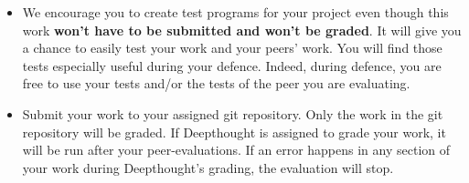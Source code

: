\begin{itemize}
  \item We encourage you to create test programs for your
  project even though this work \textbf{won't have to be
  submitted and won't be graded}. It will give you a chance
  to easily test your work and your peers’ work. You will find
  those tests especially useful during your defence. Indeed,
  during defence, you are free to use your tests and/or the
  tests of the peer you are evaluating.
  
  \item Submit your work to your assigned git repository. Only the work in the
  git repository will be graded. If Deepthought is assigned to grade your
  work, it will be run after your peer-evaluations.
  If an error happens in any section of your work during Deepthought's grading,
  the evaluation will stop.
\end{itemize}